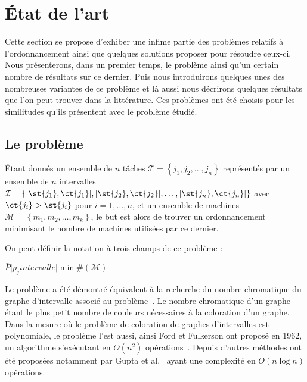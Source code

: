 \documentclass[a4paper,11pt]{report}
\begin{document}
\newpage
\chapter{État de l'art}


Cette section se propose d'exhiber une infime partie des problèmes relatifs à l'ordonnancement
ainsi que quelques solutions proposer pour résoudre ceux-ci. Nous présenterons, dans un premier
temps, le problème \bisched{} ainsi qu'un certain nombre de résultats sur ce dernier. Puis nous
introduirons quelques unes des nombreuses variantes de ce problème et là aussi nous décrirons
quelques résultats que l'on peut trouver dans la littérature. Ces problèmes ont été choisis pour les
similitudes qu'ils présentent avec le problème étudié.

\section{Le problème \bisched{}}

Étant donnés un ensemble de $n$ tâches $\mathcal{T} = \left\{
j_1, j_2, \dots, j_n \right\}$ représentés par un ensemble de $n$ intervalles $\mathcal{I} = \{
[ \st{j_1}, \ct{j_1} ], [ \st{j_2}, \ct{j_2} ], \dots, [ \st{j_n},
\ct{j_n} ] \}$ avec $\ct{j_i} > \st{j_i}$ pour $i = 1, \dots, n$, et un ensemble de
machines $\mathcal{M} = \left\{ m_1, m_2, \dots, m_k \right\}$, le but est alors de trouver un
ordonnancement minimisant le nombre de machines utilisées par ce dernier.

On peut définir la notation à trois champs de ce problème :
\begin{center}
    $\bar{P} \Big| p_j intervalle \Big| \min \#(\mathcal{M})$
\end{center}

Le problème \bisched{} a été démontré équivalent à la recherche du nombre chromatique du graphe d'intervalle
associé au problème~\cite{golumbicalgorithmic}. Le nombre chromatique d'un graphe étant le plus
petit nombre de couleurs nécessaires à la coloration d'un graphe. Dans la mesure où le problème de
coloration de graphes d'intervalles est polynomiale, le problème \bisched{} l'est aussi, ainsi Ford et
Fulkerson ont proposé en 1962, un algorithme s'exécutant en $O(n^2)$
opérations~\cite{ford1962network}. Depuis d'autres méthodes ont été proposées notamment par Gupta et
al.~\cite{gupta_optimal_1978} ayant une complexité en $O(n\log n)$ opérations.
\end{document}
